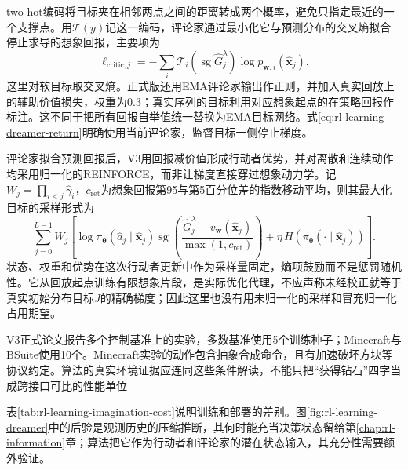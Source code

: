 two-hot编码将目标夹在相邻两点之间的距离转成两个概率，避免只指定最近的一个支撑点。用$\mathcal T(y)$记这一编码，评论家通过最小化它与预测分布的交叉熵拟合停止求导的想象回报，主要项为
\[
  \ell_{\mathrm{critic},j}
    =-\sum_i\mathcal T_i(\operatorname{sg}\widehat G_j^\lambda)
                   \log p_{\bm w,i}(\widehat{\bm x}_j).
\]
这里对软目标取交叉熵。正式版还用EMA评论家输出作正则，并加入真实回放上的辅助价值损失，权重为$0.3$；真实序列的目标利用对应想象起点的在策略回报作标注。这不同于把所有回报自举值统一替换为EMA目标网络。式\eqref{eq:rl-learning-dreamer-return}明确使用当前评论家，监督目标一侧停止梯度。

评论家拟合预测回报后，V3用回报减价值形成行动者优势，并对离散和连续动作均采用归一化的REINFORCE，而非让梯度直接穿过想象动力学。记
$W_j=\prod_{i<j}\widehat\gamma_i$，$c_{\mathrm{ret}}$为想象回报第95与第5百分位差的指数移动平均，则其最大化目标的采样形式为
\begin{equation}
 \sum_{j=0}^{L-1}W_j\left[
   \log\pi_{\bm\theta}(\widehat a_j\mid\widehat{\bm x}_j)
   \operatorname{sg}\left(
       \frac{\widehat G_j^\lambda-v_{\bm w}(\widehat{\bm x}_j)}
            {\max(1,c_{\mathrm{ret}})}\right)
     +\eta\,H(\pi_{\bm\theta}(\cdot\mid\widehat{\bm x}_j))
                       \right].
 \label{eq:rl-learning-dreamer-actor}
\end{equation}
状态、权重和优势在这次行动者更新中作为采样量固定，熵项鼓励而不是惩罚随机性。它从回放起点训练有限想象片段，是实际优化代理，不应声称未经校正就等于真实初始分布目标$J$的精确梯度；因此这里也没有用未归一化的采样和冒充归一化占用期望。

V3正式论文报告多个控制基准上的实验，多数基准使用5个训练种子；Minecraft与BSuite使用10个。Minecraft实验的动作包含抽象合成命令，且有加速破坏方块等协议约定。算法的真实环境证据应连同这些条件解读，不能只把“获得钻石”四字当成跨接口可比的性能单位

表\ref{tab:rl-learning-imagination-cost}说明训练和部署的差别。图\ref{fig:rl-learning-dreamer}中的后验是观测历史的压缩推断，其何时能充当决策状态留给第\ref{chap:rl-information}章；算法把它作为行动者和评论家的潜在状态输入，其充分性需要额外验证。

